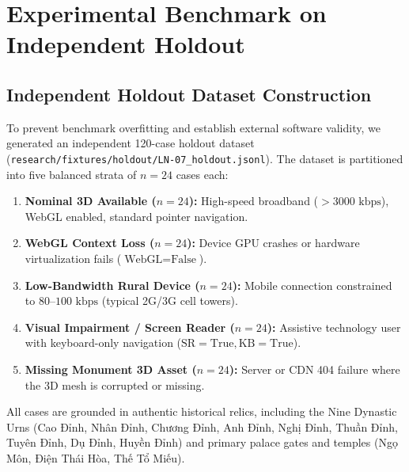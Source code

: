 \documentclass[11pt,a4paper]{article}
\begin{document}
\section{Experimental Benchmark on Independent Holdout}

\subsection{Independent Holdout Dataset Construction}
To prevent benchmark overfitting and establish external software validity, we generated an independent 120-case holdout dataset (\texttt{research/fixtures/holdout/LN-07\_holdout.jsonl}). The dataset is partitioned into five balanced strata of $n = 24$ cases each:
\begin{enumerate}
    \item \textbf{Nominal 3D Available ($n=24$):} High-speed broadband ($>3000\text{ kbps}$), WebGL enabled, standard pointer navigation.
    \item \textbf{WebGL Context Loss ($n=24$):} Device GPU crashes or hardware virtualization fails ($\text{WebGL} = \text{False}$).
    \item \textbf{Low-Bandwidth Rural Device ($n=24$):} Mobile connection constrained to $80$--$100\text{ kbps}$ (typical 2G/3G cell towers).
    \item \textbf{Visual Impairment / Screen Reader ($n=24$):} Assistive technology user with keyboard-only navigation ($\text{SR} = \text{True}, \text{KB} = \text{True}$).
    \item \textbf{Missing Monument 3D Asset ($n=24$):} Server or CDN 404 failure where the 3D mesh is corrupted or missing.
\end{enumerate}
All cases are grounded in authentic historical relics, including the Nine Dynastic Urns (Cao Đỉnh, Nhân Đỉnh, Chương Đỉnh, Anh Đỉnh, Nghị Đỉnh, Thuần Đỉnh, Tuyên Đỉnh, Dụ Đỉnh, Huyền Đỉnh) and primary palace gates and temples (Ngọ Môn, Điện Thái Hòa, Thế Tổ Miếu).
\end{document}
